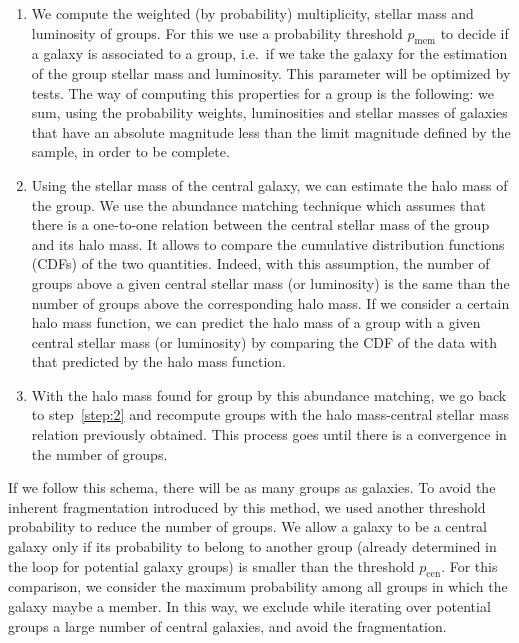 \begin{enumerate}
    \item We compute the weighted (by probability) multiplicity, stellar mass
        and luminosity of groups. For this we use a probability threshold
        $p_\mathrm{mem}$ to decide if a galaxy is associated to a group, i.e.\ if we
        take the galaxy for the estimation of the group stellar mass and
        luminosity. This parameter will be optimized by tests. The way of
        computing this properties for a group is the following: we sum, using
        the probability weights, luminosities and stellar masses of galaxies
        that have an absolute magnitude less than the limit magnitude defined
        by the sample, in order to be complete.

    \item Using the stellar mass of the central galaxy, we can estimate the
        halo mass of the group. We use the abundance matching technique which
        assumes that there is a one-to-one relation between the central stellar
        mass of the group and its halo mass. It allows to compare the
        cumulative distribution functions (CDFs) of the two quantities. Indeed,
        with this assumption, the number of groups above a given central
        stellar mass (or luminosity) is the same than the number of groups
        above the corresponding halo mass. If we consider a certain halo mass
        function, we can predict the halo mass of a group with a given central
        stellar mass (or luminosity) by comparing the CDF of the data with that
        predicted by the halo mass function.

    \item With the halo mass found for group by this abundance matching, we
        go back to step~\ref{step:2} and recompute groups with the halo
        mass-central stellar mass relation previously obtained. This process
        goes until there is a convergence in the number of groups.
\end{enumerate}

If we follow this schema, there will be as many groups as galaxies. To avoid
the inherent fragmentation introduced by this method, we used another threshold
probability to reduce the number of groups. We allow a galaxy to be a central
galaxy only if its probability to belong to another group (already determined
in the loop for potential galaxy groups) is smaller than the threshold
$p_\mathrm{cen}$. For this comparison, we consider the maximum probability
among all groups in which the galaxy maybe a member. In this way, we exclude
while iterating over potential groups a large number of central galaxies, and
avoid the fragmentation.

